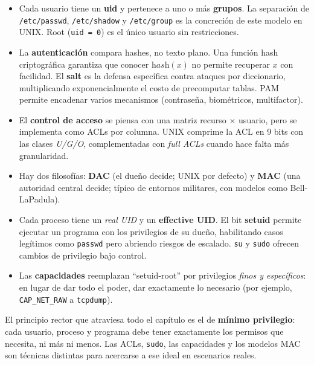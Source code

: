 \documentclass[11pt,a4paper]{article}
\begin{document}
\begin{itemize}[leftmargin=*]
    \item Cada usuario tiene un \textbf{uid} y pertenece a uno o más
        \textbf{grupos}. La separación de \texttt{/etc/passwd},
        \texttt{/etc/shadow} y \texttt{/etc/group} es la concreción de
        este modelo en UNIX. Root (\texttt{uid = 0}) es el único
        usuario sin restricciones.
    \item La \textbf{autenticación} compara hashes, no texto plano.
        Una función hash criptográfica garantiza que conocer
        $\textit{hash}(x)$ no permite recuperar $x$ con facilidad. El
        \textbf{salt} es la defensa específica contra ataques por
        diccionario, multiplicando exponencialmente el costo de
        precomputar tablas. PAM permite encadenar varios mecanismos
        (contraseña, biométricos, multifactor).
    \item El \textbf{control de acceso} se piensa con una matriz
        recurso $\times$ usuario, pero se implementa como ACLs por
        columna. UNIX comprime la ACL en 9 bits con las clases
        \emph{U/G/O}, complementadas con \emph{full ACLs} cuando hace
        falta más granularidad.
    \item Hay dos filosofías: \textbf{DAC} (el dueño decide; UNIX por
        defecto) y \textbf{MAC} (una autoridad central decide; típico
        de entornos militares, con modelos como Bell-LaPadula).
    \item Cada proceso tiene un \emph{real UID} y un
        \textbf{effective UID}. El bit \textbf{setuid} permite
        ejecutar un programa con los privilegios de su dueño,
        habilitando casos legítimos como \texttt{passwd} pero abriendo
        riesgos de escalado. \texttt{su} y \texttt{sudo} ofrecen
        cambios de privilegio bajo control.
    \item Las \textbf{capacidades} reemplazan ``setuid-root'' por
        privilegios \emph{finos y específicos}: en lugar de dar todo
        el poder, dar exactamente lo necesario (por ejemplo,
        \texttt{CAP\_NET\_RAW} a \texttt{tcpdump}).
\end{itemize}

\begin{idea}
El principio rector que atraviesa todo el capítulo es el de
\textbf{mínimo privilegio}: cada usuario, proceso y programa debe
tener exactamente los permisos que necesita, ni más ni menos. Las
ACLs, \texttt{sudo}, las capacidades y los modelos MAC son técnicas
distintas para acercarse a ese ideal en escenarios reales.
\end{idea}
\end{document}
